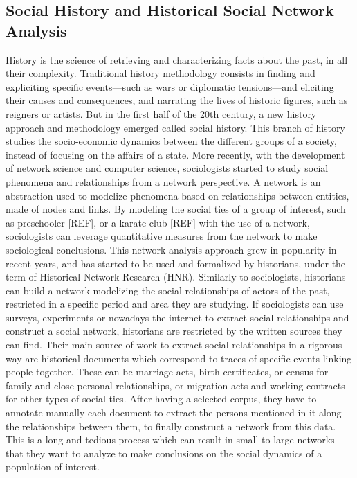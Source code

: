 \subsection{Social History and Historical Social Network Analysis}

History is the science of retrieving and characterizing facts about the past, in all their complexity. Traditional history methodology consists in finding and expliciting specific events---such as wars or diplomatic tensions---and eliciting their causes and consequences, and narrating the lives of historic figures, such as reigners or artists. But in the first half of the 20th century, a new history approach and methodology emerged called social history. This branch of history studies the socio-economic dynamics between the different groups of a society, instead of focusing on the affairs of a state.
More recently, wth the development of network science and computer science, sociologists started to study social phenomena and relationships from a network perspective. A network is an abstraction used to modelize phenomena based on relationships between entities, made of nodes and links. By modeling the social ties of a group of interest, such as preschooler [REF], or a karate club [REF] with the use of a network, sociologists can leverage quantitative measures from the network to make sociological conclusions.
This network analysis approach grew in popularity in recent years, and has started to be used and formalized by historians, under the term of Historical Network Research (HNR). Similarly to sociologists, historians can build a network modelizing the social relationships of actors of the past, restricted in a specific period and area they are studying. If sociologists can use surveys, experiments or nowadays the internet to extract social relationships and construct a social network, historians are restricted by the written sources they can find. Their main source of work to extract social relationships in a rigorous way are historical documents which correspond to traces of specific events linking people together. These can be marriage acts, birth certificates, or census for family and close personal relationships, or migration acts and working contracts for other types of social ties. After having a selected corpus, they have to annotate manually each document to extract the persons mentioned in it along the relationships between them, to finally construct a network from this data. This is a long and tedious process which can result in small to large networks that they want to analyze to make conclusions on the social dynamics of a population of interest.
